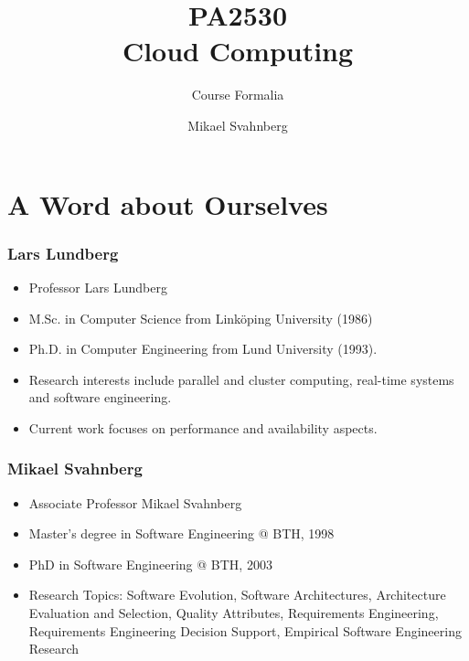 \documentclass[10pt]{beamer}
\title[]{PA2530\\Cloud Computing}
\subtitle{Course Formalia}
\author[Mikael Svahnberg]{Mikael Svahnberg\inst{1}}
\institute[BTH] %
{
  \inst{1}%
 Mikael.Svahnberg@bth.se\\
 School of Computing\\
 Blekinge Institute of Technology%
}
\begin{document}
\begin{frame}
  \titlepage
\end{frame}


\section{A Word about Ourselves}
\begin{frame}[t]
\frametitle{Lars Lundberg}
\begin{itemize}
\item Professor Lars Lundberg
\item M.Sc. in Computer Science from Linköping University (1986)
\item Ph.D. in Computer Engineering from Lund University (1993).
\item Research interests include parallel and cluster computing, real-time systems and software engineering.
\item Current work focuses on performance and availability aspects.
\end{itemize}
\end{frame}

\begin{frame}[t]
\frametitle{Mikael Svahnberg}
\begin{itemize}
\item Associate Professor Mikael Svahnberg
\item Master's degree in Software Engineering @ BTH, 1998
\item PhD in Software Engineering @ BTH, 2003
\item Research Topics: Software Evolution, Software Architectures, Architecture Evaluation and Selection, Quality Attributes, Requirements Engineering, Requirements Engineering Decision Support, Empirical Software Engineering Research
\end{itemize}
\end{frame}
\end{document}

